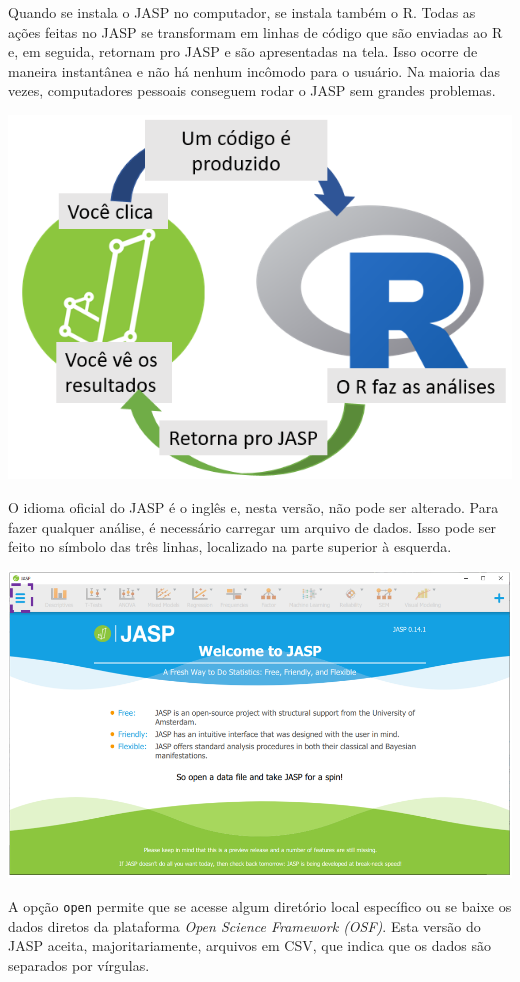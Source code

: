 \documentclass[
]{book}
\begin{document}
Quando se instala o JASP no computador, se instala também o R. Todas as ações feitas no JASP se transformam em linhas de código que são enviadas ao R e, em seguida, retornam pro JASP e são apresentadas na tela. Isso ocorre de maneira instantânea e não há nenhum incômodo para o usuário. Na maioria das vezes, computadores pessoais conseguem rodar o JASP sem grandes problemas.

\includegraphics{./img/capa_r_jasp.png}

O idioma oficial do JASP é o inglês e, nesta versão, não pode ser alterado. Para fazer qualquer análise, é necessário carregar um arquivo de dados. Isso pode ser feito no símbolo das três linhas, localizado na parte superior à esquerda.

\includegraphics{./img/cap_jasp_abrir.png}

A opção \texttt{open} permite que se acesse algum diretório local específico ou se baixe os dados diretos da plataforma \emph{Open Science Framework (OSF)}. Esta versão do JASP aceita, majoritariamente, arquivos em CSV, que indica que os dados são separados por vírgulas.
\end{document}
